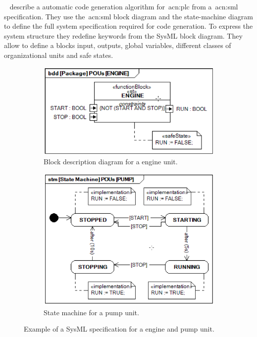 \citeauthor{6957399}~\cite{6957399} describe a automatic code generation algorithm for~\acrshort{acn:plc} from a~\acrshort{acn:sml} specification.
They use the~\acrshort{acn:sml} block diagram and the state-machine diagram to define the full system specification required for code generation.
To express the system structure they redefine keywords from the SysML block diagram.
They allow to define a blocks input, outputs, global variables, different classes of organizational units and safe states.
\begin{figure}
	\begin{subfigure}{0.5\textwidth}
		\includegraphics[width=\textwidth]{./Figures/sysml_bdd.png}
		\caption{Block description diagram for a engine unit.}
		\label{fig:sysml:bdd}
	\end{subfigure}
	\begin{subfigure}{0.5\textwidth}
		\includegraphics[width=\textwidth]{./Figures/sysml_stm.png}
		\caption{State machine for a pump unit.}
		\label{fig:sysml:stm}
	\end{subfigure}
	\caption[Example of a SysML specification for a engine and pump unit.]{Example of a SysML specification for a engine and pump unit.~\cite{6957399}}
\end{figure}
